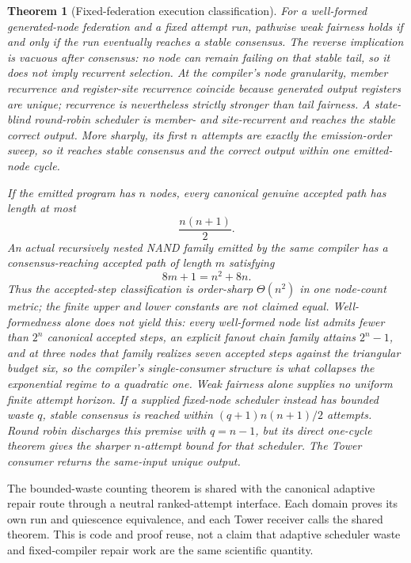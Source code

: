 \documentclass[11pt]{article}
\newtheorem{theorem}{Theorem}[section]
\theoremstyle{definition}
\theoremstyle{remark}
\numberwithin{equation}{section}
\begin{document}
\begin{theorem}[Fixed-federation execution classification]
\label{thm:fixed-federation-execution-classification}
For a well-formed generated-node federation and a fixed attempt run, pathwise
weak fairness holds if and only if the run eventually reaches a stable
consensus.  The reverse implication is vacuous after consensus: no node can
remain failing on that stable tail, so it does not imply recurrent selection.
At the compiler's node granularity, member recurrence and register-site
recurrence coincide because generated output registers are unique; recurrence
is nevertheless strictly stronger than tail fairness.  A state-blind
round-robin scheduler is member- and site-recurrent and reaches the stable
correct output.  More sharply, its first \(n\) attempts are exactly the
emission-order sweep, so it reaches stable consensus and the correct output
within one emitted-node cycle.

If the emitted program has \(n\) nodes, every canonical genuine accepted path
has length at most
\[
  \frac{n(n+1)}{2}.
\]
An actual recursively nested NAND family emitted by the same compiler has a
consensus-reaching accepted path of length \(m\) satisfying
\[
  8m+1=n^2+8n.
\]
Thus the accepted-step classification is order-sharp
\(\Theta(n^2)\) in one node-count metric; the finite upper and lower constants
are not claimed equal.  Well-formedness alone does not yield this: every
well-formed node list admits fewer than \(2^n\) canonical accepted steps, an
explicit fanout chain family attains \(2^n-1\), and at three nodes that
family realizes seven accepted steps against the triangular budget six, so
the compiler's single-consumer structure is what collapses the exponential
regime to a quadratic one.  Weak fairness alone supplies no uniform finite attempt
horizon.  If a supplied fixed-node scheduler instead has bounded waste \(q\),
stable consensus is reached within
\((q+1)n(n+1)/2\) attempts.  Round robin discharges this premise with
\(q=n-1\), but its direct one-cycle theorem gives the sharper \(n\)-attempt
bound for that scheduler.  The Tower consumer returns the same-input unique
output.
\end{theorem}

The bounded-waste counting theorem is shared with the canonical adaptive
repair route through a neutral ranked-attempt interface.  Each domain proves
its own run and quiescence equivalence, and each Tower receiver calls the
shared theorem.  This is code and proof reuse, not a claim that adaptive
scheduler waste and fixed-compiler repair work are the same scientific
quantity.
\end{document}
